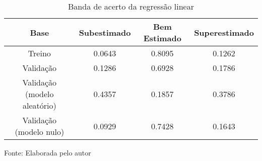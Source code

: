 
\begin{table}[h]
\centering
\caption{Banda de acerto da regressão linear}
\label{tab:cap3_band_reg_lin}
\begin{tabular}{cccc}
Base & Subestimado & Bem Estimado & Superestimado \\
\hline
Treino & 0.0643 & 0.8095 & 0.1262 \\
Validação & 0.1286 & 0.6928 & 0.1786 \\
Validação (modelo aleatório) & 0.4357 & 0.1857 & 0.3786 \\
Validação (modelo nulo) & 0.0929 & 0.7428 & 0.1643 \\
\hline
\end{tabular}

Fonte: Elaborada pelo autor
\end{table}
